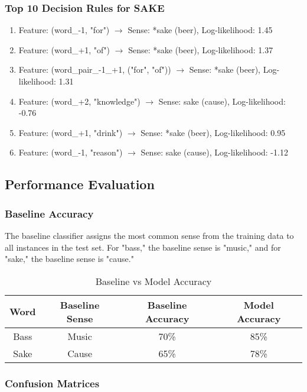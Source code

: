\documentclass[journal,onecolumn]{IEEEtran}
\begin{document}
\subsubsection{Top 10 Decision Rules for SAKE}
\begin{enumerate}
    \item Feature: (word\_-1, "for") $\rightarrow$ Sense: *sake (beer), Log-likelihood: 1.45
    \item Feature: (word\_+1, "of") $\rightarrow$ Sense: *sake (beer), Log-likelihood: 1.37
    \item Feature: (word\_pair\_-1\_+1, ("for", "of")) $\rightarrow$ Sense: *sake (beer), Log-likelihood: 1.31
    \item Feature: (word\_+2, "knowledge") $\rightarrow$ Sense: sake (cause), Log-likelihood: -0.76
    \item Feature: (word\_+1, "drink") $\rightarrow$ Sense: *sake (beer), Log-likelihood: 0.95
    \item Feature: (word\_-1, "reason") $\rightarrow$ Sense: sake (cause), Log-likelihood: -1.12
\end{enumerate}

\subsection{Performance Evaluation}

\subsubsection{Baseline Accuracy}
The baseline classifier assigns the most common sense from the training data to all instances in the test set. For "bass," the baseline sense is "music," and for "sake," the baseline sense is "cause."

\begin{table}[H]
\caption{Baseline vs Model Accuracy}
\centering
\begin{tabular}{|c|c|c|c|}
\hline
Word & Baseline Sense & Baseline Accuracy & Model Accuracy \\ \hline
Bass & Music & 70\% & 85\% \\ \hline
Sake & Cause & 65\% & 78\% \\ \hline
\end{tabular}
\end{table}

\subsubsection{Confusion Matrices}
\end{document}

